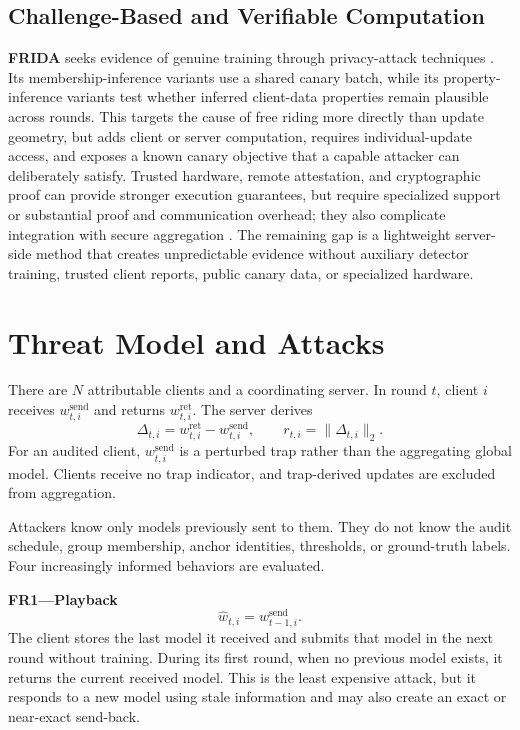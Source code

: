 \documentclass[conference]{IEEEtran}
\begin{document}
\subsection{Challenge-Based and Verifiable Computation}
\textbf{FRIDA} seeks evidence of genuine training through privacy-attack techniques \cite{recasens2024frida}. Its membership-inference variants use a shared canary batch, while its property-inference variants test whether inferred client-data properties remain plausible across rounds. This targets the cause of free riding more directly than update geometry, but adds client or server computation, requires individual-update access, and exposes a known canary objective that a capable attacker can deliberately satisfy. Trusted hardware, remote attestation, and cryptographic proof can provide stronger execution guarantees, but require specialized support or substantial proof and communication overhead; they also complicate integration with secure aggregation \cite{bonawitz2017practical}. The remaining gap is a lightweight server-side method that creates unpredictable evidence without auxiliary detector training, trusted client reports, public canary data, or specialized hardware.

\section{Threat Model and Attacks}
There are $N$ attributable clients and a coordinating server. In round $t$, client $i$ receives $w^{\mathrm{send}}_{t,i}$ and returns $w^{\mathrm{ret}}_{t,i}$. The server derives
\begin{equation}
\Delta_{t,i}=w^{\mathrm{ret}}_{t,i}-w^{\mathrm{send}}_{t,i},\qquad
r_{t,i}=\lVert\Delta_{t,i}\rVert_2.
\end{equation}
For an audited client, $w^{\mathrm{send}}_{t,i}$ is a perturbed trap rather than the aggregating global model. Clients receive no trap indicator, and trap-derived updates are excluded from aggregation.

Attackers know only models previously sent to them. They do not know the audit schedule, group membership, anchor identities, thresholds, or ground-truth labels. Four increasingly informed behaviors are evaluated.

\medskip\noindent\textbf{FR1---Playback}
\begin{equation}
\widehat w_{t,i}=w^{\mathrm{send}}_{t-1,i}.
\end{equation}
The client stores the last model it received and submits that model in the next round without training. During its first round, when no previous model exists, it returns the current received model. This is the least expensive attack, but it responds to a new model using stale information and may also create an exact or near-exact send-back.
\end{document}
